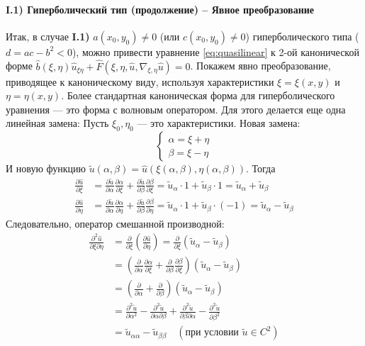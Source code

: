 \documentclass[12pt, a4paper]{article}
\begin{document}
\paragraph{I.1) Гиперболический тип (продолжение) -- Явное преобразование}
Итак, в случае \textbf{I.1)} $a(x_0,y_0) \neq 0$ (или $c(x_0,y_0) \neq 0$) гиперболического типа ($d=ac-b^2 < 0$), можно привести уравнение \eqref{eq:quasilinear} к 2-ой канонической форме $\hat{b}(\xi,\eta)\hat{u}_{\xi\eta} + \hat{F}(\xi,\eta,\hat{u},\nabla_{\xi,\eta}\hat{u}) = 0$.
Покажем явно преобразование, приводящее к каноническому виду, используя характеристики $\xi=\xi(x,y)$ и $\eta=\eta(x,y)$.
Более стандартная каноническая форма для гиперболического уравнения --- это форма с волновым оператором. Для этого делается еще одна линейная замена:
Пусть $\xi_0, \eta_0$ — это характеристики.
Новая замена:
\[
\begin{cases}
\alpha = \xi + \eta \\
\beta = \xi - \eta
\end{cases}
\]
И новую функцию $\tilde{u}(\alpha,\beta) = \hat{u}(\xi(\alpha,\beta), \eta(\alpha,\beta))$.
Тогда
\begin{align*}
\frac{\partial \hat{u}}{\partial \xi} &= \frac{\partial \tilde{u}}{\partial \alpha}\frac{\partial \alpha}{\partial \xi} + \frac{\partial \tilde{u}}{\partial \beta}\frac{\partial \beta}{\partial \xi} = \tilde{u}_{\alpha} \cdot 1 + \tilde{u}_{\beta} \cdot 1 = \tilde{u}_{\alpha} + \tilde{u}_{\beta} \\
\frac{\partial \hat{u}}{\partial \eta} &= \frac{\partial \tilde{u}}{\partial \alpha}\frac{\partial \alpha}{\partial \eta} + \frac{\partial \tilde{u}}{\partial \beta}\frac{\partial \beta}{\partial \eta} = \tilde{u}_{\alpha} \cdot 1 + \tilde{u}_{\beta} \cdot (-1) = \tilde{u}_{\alpha} - \tilde{u}_{\beta}
\end{align*}
Следовательно, оператор смешанной производной:
\begin{align*}
\frac{\partial^2 \hat{u}}{\partial \xi \partial \eta} &= \frac{\partial}{\partial \xi} \left( \frac{\partial \hat{u}}{\partial \eta} \right) = \frac{\partial}{\partial \xi} (\tilde{u}_{\alpha} - \tilde{u}_{\beta}) \\
&= \left( \frac{\partial}{\partial \alpha}\frac{\partial \alpha}{\partial \xi} + \frac{\partial}{\partial \beta}\frac{\partial \beta}{\partial \xi} \right) (\tilde{u}_{\alpha} - \tilde{u}_{\beta}) \\
&= \left( \frac{\partial}{\partial \alpha} + \frac{\partial}{\partial \beta} \right) (\tilde{u}_{\alpha} - \tilde{u}_{\beta}) \\
&= \frac{\partial^2 \tilde{u}}{\partial \alpha^2} - \frac{\partial^2 \tilde{u}}{\partial \alpha \partial \beta} + \frac{\partial^2 \tilde{u}}{\partial \beta \partial \alpha} - \frac{\partial^2 \tilde{u}}{\partial \beta^2} \\
&= \tilde{u}_{\alpha\alpha} - \tilde{u}_{\beta\beta} \quad (\text{при условии } \tilde{u} \in C^2)
\end{align*}
\end{document}
